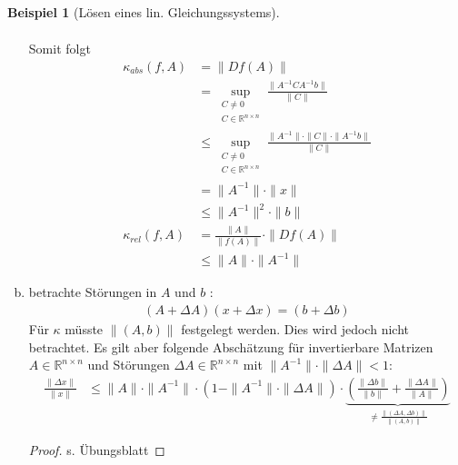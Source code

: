 \documentclass[ngerman,fontsize=11pt, paper=a4, parskip=half, titlepage=true, toc=bib]{scrbook}
\theoremstyle{definition}
\newtheorem{Bsp}[Def]{Beispiel}
\theoremstyle{plain}
\newcommand{\R}{\mathds{R}}
\newcommand{\Renn}{\mathds{R}^{n\times n}}
\newenvironment{Bspe}[1][]{ %
	\begin{Bsp}[#1]
	}
	{
	\end{Bsp}
	\addtocounter{subsection}{1}
}
\begin{document}
\begin{Bspe}[Lösen eines lin. Gleichungssystems]
\begin{enumerate}[a)]
\begin{gather*}
		\end{gather*}
		Somit folgt
		\begin{align}
		\nonumber
		\kappa_{abs} (f,A) &= \|Df(A)\| \\ \nonumber
		&= \sup_{\substack{
				C\neq 0 \\ 
				C\in \R^{n\times n}											  	
			}}
			\frac{\|A^{-1}CA^{-1}b\|}{\|C\|} \\ \nonumber
			&\leq \sup_{\substack{
					C\neq 0 \\ 
					C \in \R^{n\times n}														  	
				}}
				\frac{\|A^{-1}\|\cdot\|C\|\cdot\|A^{-1}b\|}{\|C\|} \\ \nonumber
				&= \|A^{-1}\| \cdot\|x\| \\ \nonumber
				&\leq   \|A^{-1}\|^2 \cdot\|b\| \\ \nonumber
				\kappa_{rel}(f,A)  &= \frac{\|A\|}{\|f(A)\|} \cdot \|Df(A)\| \\
				&\leq \|A\|\cdot \|A^{-1}\| \label{III.2.10}
				\end{align}
				\item betrachte Störungen in $A$ und $b$ :
				\begin{gather*}
				(A+\Delta A)(x+\Delta x) = (b+\Delta b) 
				\end{gather*}
				Für $\kappa$ müsste $\|(A,b)\|$ festgelegt werden. Dies wird jedoch nicht betrachtet. Es gilt aber folgende Abschätzung für invertierbare Matrizen $A\in \Renn $ und Störungen
				$\Delta A \in \R^{n\times n}$ mit $\|A^{-1}\|\cdot \|\Delta A\| < 1$:
				\begin{align}
				\frac{\|\Delta x\|}{\|x\|} & \leq \|A\| \cdot \|A^{-1}\|\cdot (1- \|A^{-1}\|\cdot \|\Delta A\|) 
				\cdot
				\underbrace{\left(  \frac{\|\Delta b\|}{\|b\|} +  \frac{\|\Delta A\|}{\|A\|}  \right)}_{\neq  \frac{\|(\Delta A, \Delta b)\|}{\|(A,b)\|} }
				\label{III.2.11}
				\end{align}
				\begin{proof} s. Übungsblatt \end{proof}
			\end{enumerate}
\end{Bspe}
\end{document}
